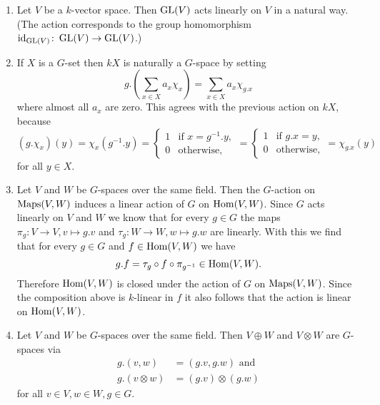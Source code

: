 \begin{expls}
  \begin{enumerate}[label=\emph{\alph*)},leftmargin=*]
    \item
      Let $V$ be a $k$-vector space.
      Then $\operatorname{GL}(V)$ acts linearly on $V$ in a natural way.
      (The action corresponds to the group homomorphism $\operatorname{id}_{\operatorname{GL}(V)} \colon \operatorname{GL}(V) \to \operatorname{GL}(V)$.)
    \item
      If $X$ is a $G$-set then $kX$ is naturally a $G$-space by setting
      \[
          g.\left(\sum_{x \in X} a_x \chi_x\right)
        = \sum_{x \in X} a_x \chi_{g.x}
      \]
      where almost all $a_x$ are zero.
      This agrees with the previous action on $kX$, because
      \[
          (g.\chi_x)(y)
        = \chi_x(g^{-1}.y)
        = \begin{cases}
            1 & \text{if } x = g^{-1}.y, \\
            0 & \text{otherwise},
          \end{cases}
        = \begin{cases}
            1 & \text{if } g.x = y, \\
            0 & \text{otherwise},
          \end{cases}
        = \chi_{g.x}(y)
      \]
      for all $y \in X$.
    \item
      Let $V$ and $W$ be $G$-spaces over the same field.
      Then the $G$-action on $\operatorname{Maps}(V,W)$ induces a linear action of $G$ on $\operatorname{Hom}(V,W)$.
      Since $G$ acts linearly on $V$ and $W$ we know that for every $g \in G$ the maps $\pi_g \colon V \to V, v \mapsto g.v$ and $\tau_g \colon W \to W, w \mapsto g.w$ are linearly.
      With this we find that for every $g \in G$ and $f \in \operatorname{Hom}(V,W)$ we have
      \[
            g.f
        =   \tau_g \circ f \circ \pi_{g^{-1}}
        \in \operatorname{Hom}(V,W).
      \]
      Therefore $\operatorname{Hom}(V,W)$ is closed under the action of $G$ on $\operatorname{Maps}(V,W)$.
      Since the composition above is $k$-linear in $f$ it also follows that the action is linear on $\operatorname{Hom}(V,W)$.
    \item
      Let $V$ and $W$ be $G$-spaces over the same field.
      Then $V \oplus W$ and $V \otimes W$ are $G$-spaces via
      \begin{align*}
            g.(v,w)
        &= (g.v,g.w)
           \text{ and }
            \tag{1}
        \\
            g.(v \otimes w)
        &=  (g.v) \otimes (g.w)
            \tag{2}
      \end{align*}
      for all $v \in V, w \in W, g \in G$. 

\end{enumerate}
\end{expls}
